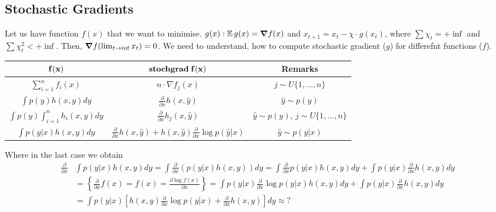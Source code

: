 \subsection{Stochastic Gradients}

Let us have function $f(x)$ that we want to minimise. $g(x) : \operatorname{\mathbb{E}} g(x) = \grad f(x)$ and $x_{t + 1} = x_t - \chi \cdot g(x_t)$, where $\sum \chi_t = + \inf$ and $\sum \chi_t^2 < + \inf$. Then, $\grad f(\lim_{t \to \inf} x_t) = 0$. We need to understand, how to compute stochastic gradient ($g$) for differefnt functions ($f$). 

\setlength{\arrayrulewidth}{0.3mm}
\renewcommand{\arraystretch}{1.5}
\begin{table}[!h]
    \centering
    \begin{tabular}{|| c | c | c ||}
        \hline
        $\bf{f(x)}$ & $\bf{\textbf{stochgrad} \; f(x)}$ & \textbf{Remarks} \\ [0.5ex] 
        \hline \hline
        $\sum_{i = 1}^n f_i(x)$ & $n \cdot \nabla f_j(x)$ & $j \sim U\{1, \ldots, n\}$ \\ \hline
        $\int p(y) h(x, y) dy$ & $\frac{\partial}{\partial x} h(x, \widehat{y})$ & $\widehat{y} \sim p(y)$ \\ \hline 
        $\int p(y) \int_{i = 1}^n h_i(x, y) dy$ & $\frac{\partial}{\partial x} h_j(x, \widehat{y})$ & $\widehat{y} \sim p(y)$, $j \sim U\{1, \ldots, n\}$ \\ \hline
        $\int p(y | x) h(x, y) dy$ & $\frac{\partial}{\partial x} h(x, \widehat{y}) + h(x, \widehat{y}) \frac{\partial}{\partial x} \log p(\widehat{y}| x)$ & $\widehat{y} \sim p(y | x)$ \\ \hline
    \end{tabular}
\end{table}

Where in the last case we obtain 
\begin{equation*}
    \begin{aligned}
        \frac{\partial}{\partial x} &\int p(y | x) h(x, y) dy = \int \frac{\partial}{\partial x} \left( p(y | x) h(x, y) \right) dy = \int \frac{\partial}{\partial x} p(y | x) h(x, y) dy + \int p(y | x) \frac{\partial}{\partial x} h(x, y) dy \\ 
        &= \left\{ \frac{\partial}{\partial x} f(x) = f(x) = \frac{\partial \log f(x)}{\partial x} \right\} = \int p(y| x)\frac{\partial}{\partial x} \log p(y | x) h(x, y) dy + \int p(y | x) \frac{\partial}{\partial x} h(x, y) dy  \\  
        &= \int p(y| x) \left[ h(x, y) \frac{\partial}{\partial x} \log p(y | x) + \frac{\partial}{\partial x} h(x, y) \right] dy \approx ?
    \end{aligned}
\end{equation*}

